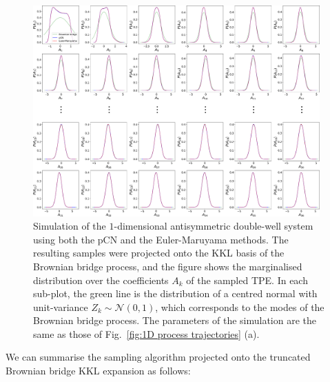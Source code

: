\begin{figure}[t]
\includegraphics[width=0.98\textwidth]{figs_part1/mcmc/1D_process_MCMC_vs_Langevin}
\centering \caption{Simulation of the $1$-dimensional antisymmetric double-well system using both the pCN and the Euler-Maruyama methods. The resulting samples were projected onto the KKL basis of the Brownian bridge process, and the figure shows the marginalised distribution over the coefficients $A_k$ of the sampled TPE. In each sub-plot, the green line is the distribution of a centred normal with unit-variance $Z_k \sim \mathcal{N}(0,1)$, which corresponds to the modes of the Brownian bridge process. The parameters of the simulation are the same as those of Fig.~\ref{fig:1D process trajectories} (a).}
\label{fig:1D process MCMC vs Euler-Maruyama} 
\end{figure}

We can summarise the sampling algorithm projected onto the truncated Brownian bridge KKL expansion as follows:

